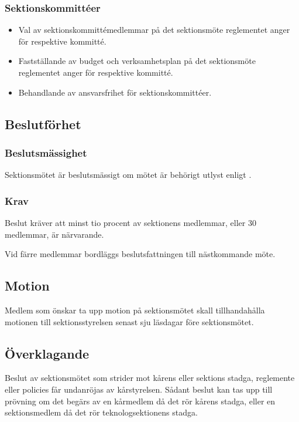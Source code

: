 \subsubsection{Sektionskommittéer}
\begin{itemize}
	\item Val av sektionskommittémedlemmar på det sektionsmöte reglementet anger för respektive kommitté. 
	\item Fastställande av budget och verksamhetsplan på det sektionsmöte reglementet anger för respektive kommitté.
	\item Behandlande av ansvarsfrihet för sektionskommittéer.
\end{itemize}

\subsection{Beslutförhet}

\subsubsection{Beslutsmässighet}
Sektionsmötet är beslutsmässigt om mötet är behörigt utlyst enligt .

\subsubsection{Krav}
Beslut kräver att minst tio procent av sektionens medlemmar, eller 30 medlemmar, är närvarande.

Vid färre medlemmar bordläggs beslutsfattningen till nästkommande möte.

\subsection{Motion}
Medlem som önskar ta upp motion på sektionsmötet skall tillhandahålla motionen till sektionsstyrelsen senast sju läsdagar före sektionsmötet.

\subsection{Överklagande}
Beslut av sektionsmötet som strider mot kårens eller sektions stadga, reglemente eller policies får undanröjas av kårstyrelsen. Sådant beslut kan tas upp till prövning om det begärs av en kårmedlem då det rör kårens stadga, eller en sektionsmedlem då det rör teknologsektionens stadga.

